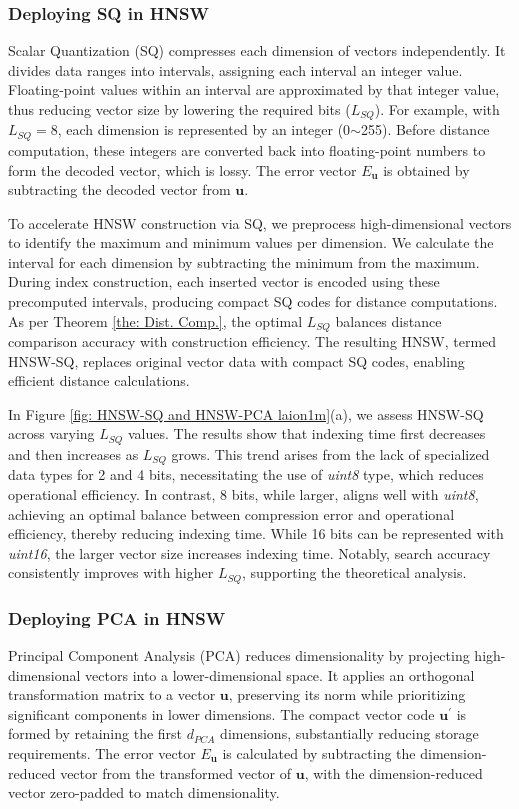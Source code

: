 \subsubsection{\textbf{Deploying SQ in HNSW}}
\label{subsubsec: HNSW SQ}
Scalar Quantization (SQ) \cite{LVQ,Boufounos12} compresses each dimension of vectors independently. It divides data ranges into intervals, assigning each interval an integer value. Floating-point values within an interval are approximated by that integer value, thus reducing vector size by lowering the required bits ($L_{SQ}$). {For example, with $L_{SQ} = 8$, each dimension is represented by an integer (0$\sim$255). Before distance computation, these integers are converted back into floating-point numbers to form the decoded vector, which is lossy. The error vector $E_{\boldsymbol{u}}$ is obtained by subtracting the decoded vector from $\boldsymbol{u}$.}

To accelerate HNSW construction via SQ, we preprocess high-dimensional vectors to identify the maximum and minimum values per dimension. We calculate the interval for each dimension by subtracting the minimum from the maximum. During index construction, each inserted vector is encoded using these precomputed intervals, producing compact SQ codes for distance computations. As per Theorem \ref{the: Dist. Comp.}, the optimal $L_{SQ}$ balances distance comparison accuracy with construction efficiency. The resulting HNSW, termed HNSW-SQ, replaces original vector data with compact SQ codes, enabling efficient distance calculations.

In Figure \ref{fig: HNSW-SQ and HNSW-PCA laion1m}(a), we assess HNSW-SQ across varying $L_{SQ}$ values. The results show that indexing time first decreases and then increases as $L_{SQ}$ grows. This trend arises from the lack of specialized data types for 2 and 4 bits, necessitating the use of \textit{uint8} type, which reduces operational efficiency. In contrast, 8 bits, while larger, aligns well with \textit{uint8}, achieving an optimal balance between compression error and operational efficiency, thereby reducing indexing time. While 16 bits can be represented with \textit{uint16}, the larger vector size increases indexing time. Notably, search accuracy consistently improves with higher $L_{SQ}$, supporting the theoretical analysis.

\subsubsection{\textbf{Deploying PCA in HNSW}}
\label{subsubsec: HNSW PCA}
Principal Component Analysis (PCA) \cite{PCA} reduces dimensionality by projecting high-dimensional vectors into a lower-dimensional space. {It applies an orthogonal transformation matrix to a vector $\boldsymbol{u}$, preserving its norm while prioritizing significant components in lower dimensions. The compact vector code $\boldsymbol{u}^{\prime}$ is formed by retaining the first $d_{PCA}$ dimensions, substantially reducing storage requirements. The error vector $E_{\boldsymbol{u}}$ is calculated by subtracting the dimension-reduced vector from the transformed vector of $\boldsymbol{u}$, with the dimension-reduced vector zero-padded to match dimensionality.}

